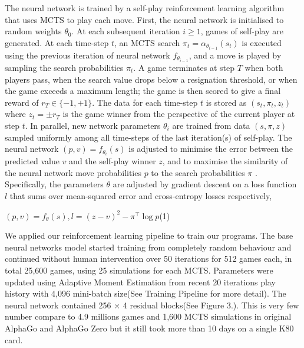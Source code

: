 \documentclass[12pt,a4paper]{article}
\begin{document}
The neural network is trained by a self-play reinforcement learning algorithm that uses MCTS to play each move. First, the neural network is initialised to random weights \(\theta_0\). At each subsequent iteration \(i \geq 1\), games of self-play are generated. At each time-step \(t\), an MCTS search \(\pi_t = \alpha_{\theta_{i−1}}(s_t)\) is executed using the previous iteration of neural network \(f_{\theta_{i−1}}\), and a move is played by sampling the search probabilities \(\pi_t\). A game terminates at step \(T\) when both players pass, when the search value drops below a resignation threshold, or when the game exceeds a maximum length; the game is then scored to give a final reward of \(r_T \in \{−1, +1\}\). The data for each time-step \(t\) is stored as \((s_t, \pi_t, z_t)\) where \(z_t = \pm r_T\) is the game winner from the perspective of the current player at step \(t\). In parallel, new network parameters \(\theta_i\) are trained from data \((s, \pi, z)\) sampled uniformly among all time-steps of the last iteration(s) of self-play. The neural network \((p, v) = f_{\theta_i}(s)\) is adjusted to minimise the error between the predicted value \(v\) and the self-play winner \(z\), and to maximise the similarity of the neural network move probabilities \(p\) to the search probabilities \(\pi\) . Specifically, the parameters \(\theta\) are adjusted by gradient descent on a loss function \(l\) that sums over mean-squared error and cross-entropy losses respectively,\par
\begin{flushleft}\hspace{4.5cm} \((p, v) = f_θ(s),\)\hspace{1cm}\(l = (z − v)^2 − \pi^\top \log p\)\hfill(1) \end{flushleft} \par
We applied our reinforcement learning pipeline to train our programs. The base neural networks model started training from completely random behaviour and continued without human intervention over 50 iterations for 512 games each, in total 25,600 games, using 25 simulations for each MCTS. Parameters were updated using Adaptive Moment Estimation\cite{Adam} from recent 20 iterations play history with 4,096 mini-batch size(See Training Pipeline for more detail). The neural network contained 256 × 4 residual blocks(See Figure 3.). This is very few number compare to 4.9 millions games and 1,600 MCTS simulations in original AlphaGo and AlphaGo Zero but it still took more than 10 days on a single K80 card.\par
\end{document}

